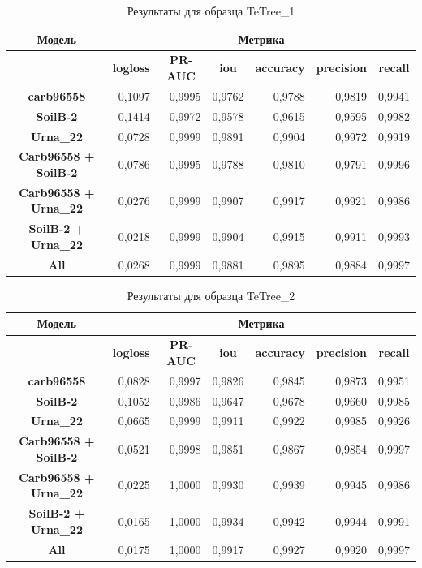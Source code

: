 \documentclass[14pt, a4paper, oneside, bold]{extarticle}
\begin{document}
\begin{table}[htbp]
\small
\begin{tabular}{|c|r|r|r|r|r|r|}
\hline
\textbf{Модель} & \multicolumn{ 6}{c|}{\textbf{Метрика}} \\ \hline
\textbf{} & \multicolumn{1}{c|}{\textbf{logloss}} & \multicolumn{1}{c|}{\textbf{PR-AUC}} & \multicolumn{1}{c|}{\textbf{iou}} & \multicolumn{1}{c|}{\textbf{accuracy}} & \multicolumn{1}{c|}{\textbf{precision}} & \multicolumn{1}{c|}{\textbf{recall}} \\ \hline
\textbf{carb96558} & 0,1097 & 0,9995 & 0,9762 & 0,9788 & 0,9819 & 0,9941 \\ \hline
\textbf{SoilB-2} & 0,1414 & 0,9972 & 0,9578 & 0,9615 & 0,9595 & 0,9982 \\ \hline
\textbf{Urna\_22} & 0,0728 & 0,9999 & 0,9891 & 0,9904 & 0,9972 & 0,9919 \\ \hline
\textbf{Carb96558 + SoilB-2} & 0,0786 & 0,9995 & 0,9788 & 0,9810 & 0,9791 & 0,9996 \\ \hline
\textbf{Carb96558 + Urna\_22} & 0,0276 & 0,9999 & 0,9907 & 0,9917 & 0,9921 & 0,9986 \\ \hline
\textbf{SoilB-2 + Urna\_22} & 0,0218 & 0,9999 & 0,9904 & 0,9915 & 0,9911 & 0,9993 \\ \hline
\textbf{All} & 0,0268 & 0,9999 & 0,9881 & 0,9895 & 0,9884 & 0,9997 \\ \hline
\end{tabular}
\caption{Результаты для образца TeTree\_1}
\label{TeTree_1}
\end{table}


\begin{table}[htbp]
\small
\begin{tabular}{|c|r|r|r|r|r|r|}
\hline
\textbf{Модель} & \multicolumn{ 6}{c|}{\textbf{Метрика}} \\ \hline
\textbf{} & \multicolumn{1}{c|}{\textbf{logloss}} & \multicolumn{1}{c|}{\textbf{PR-AUC}} & \multicolumn{1}{c|}{\textbf{iou}} & \multicolumn{1}{c|}{\textbf{accuracy}} & \multicolumn{1}{c|}{\textbf{precision}} & \multicolumn{1}{c|}{\textbf{recall}} \\ \hline
\textbf{carb96558} & 0,0828 & 0,9997 & 0,9826 & 0,9845 & 0,9873 & 0,9951 \\ \hline
\textbf{SoilB-2} & 0,1052 & 0,9986 & 0,9647 & 0,9678 & 0,9660 & 0,9985 \\ \hline
\textbf{Urna\_22} & 0,0665 & 0,9999 & 0,9911 & 0,9922 & 0,9985 & 0,9926 \\ \hline
\textbf{Carb96558 + SoilB-2} & 0,0521 & 0,9998 & 0,9851 & 0,9867 & 0,9854 & 0,9997 \\ \hline
\textbf{Carb96558 + Urna\_22} & 0,0225 & 1,0000 & 0,9930 & 0,9939 & 0,9945 & 0,9986 \\ \hline
\textbf{SoilB-2 + Urna\_22} & 0,0165 & 1,0000 & 0,9934 & 0,9942 & 0,9944 & 0,9991 \\ \hline
\textbf{All} & 0,0175 & 1,0000 & 0,9917 & 0,9927 & 0,9920 & 0,9997 \\ \hline
\end{tabular}
\caption{Результаты для образца TeTree\_2}
\label{TeTree_2}
\end{table}
\end{document}

